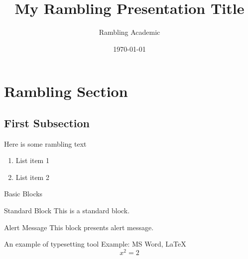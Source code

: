 \documentclass[xcolor=dvipsnames]{beamer}
\title[Title Without Rambling]{My Rambling Presentation Title}
\date{\today}
\author[R.A.]
{Rambling Academic}
\institute[RamblingAcademic.com]{RamblingAcademic.com\\Nuts and Bolts of Research. Plus Some Rambling.}
\begin{document}
\begin{frame}
  \titlepage
\end{frame}

\begin{frame}
  \tableofcontents
\end{frame}

\section{Rambling Section}

\subsection{First Subsection}

\begin{frame}
  Here is some rambling text
  \begin{enumerate}
	 \item List item 1
	 \item List item 2
  \end{enumerate}
\end{frame}


\begin{frame}{Basic Blocks}

    \begin{block}{Standard Block}
        This is a standard block.
    \end{block}

    \begin{alertblock}{Alert Message}
        This block presents alert message.
    \end{alertblock}

    \begin{exampleblock}{An example of typesetting tool}
        Example: MS Word, \LaTeX{}
		  \begin{equation}
		  	x^{2}=2
		  	\label{eq:1}
		  \end{equation}
    \end{exampleblock}

\end{frame}
\end{document}
